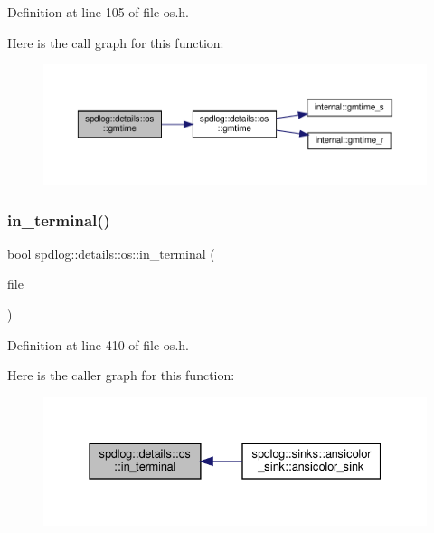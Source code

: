 Definition at line 105 of file os.\+h.

Here is the call graph for this function\+:
\nopagebreak
\begin{figure}[H]
\begin{center}
\leavevmode
\includegraphics[width=350pt]{namespacespdlog_1_1details_1_1os_a504776f0a18b0090f66778f7ad8add0b_cgraph}
\end{center}
\end{figure}
\mbox{\label{namespacespdlog_1_1details_1_1os_a2d4716c3ff12a2cc7f3bae7f3f769917}} 
\subsubsection{\texorpdfstring{in\+\_\+terminal()}{in\_terminal()}}
{\footnotesize\ttfamily bool spdlog\+::details\+::os\+::in\+\_\+terminal (\begin{DoxyParamCaption}\item[{F\+I\+LE $\ast$}]{file }\end{DoxyParamCaption})\hspace{0.3cm}{\ttfamily [inline]}}



Definition at line 410 of file os.\+h.

Here is the caller graph for this function\+:
\nopagebreak
\begin{figure}[H]
\begin{center}
\leavevmode
\includegraphics[width=331pt]{namespacespdlog_1_1details_1_1os_a2d4716c3ff12a2cc7f3bae7f3f769917_icgraph}
\end{center}
\end{figure}
\mbox{\label{namespacespdlog_1_1details_1_1os_a41c3f67d2cbabfcb20e89d0524e5097f}} 
